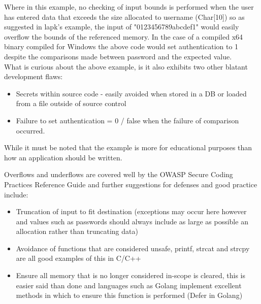 \documentclass{IEEEtran}
\begin{document}
                Where in this example, no checking of input bounds is performed when the user has 
                entered data that exceeds the size allocated to username (Char[10]) so as suggested 
                in lapk's\cite{lapk} example, the input of "0123456789abcdef1" would easily overflow
                the bounds of the referenced memory. In the case of a compiled x64 binary compiled for 
                Windows the above code would set authentication to 1 despite the comparisons made between password and the expected value.
                \\
                What is curious about the above example, is it also exhibits two other blatant 
                development flaws\cite{OWASP-SCP-Quick-Reference-Guide-v2}: 
                \begin{itemize}
                    \item Secrets within source code - easily avoided when stored in a DB or loaded
                    from a file outside of source control
                    \item Failure to set authentication = 0 / false when the failure of comparison 
                    occurred.
                \end{itemize}
                While it must be noted that the example is more for educational purposes than how an 
                application should be written.

                Overflows and underflows are covered well by the OWASP Secure Coding Practices
                Reference Guide\cite{OWASP-SCP-Quick-Reference-Guide-v2} and further suggestions 
                for defenses and good practice include: 
                \begin{itemize}
                    \item Truncation of input to fit destination (exceptions may occur here however and values such as passwords should always include as large as possible an allocation rather than truncating data)
                    \item Avoidance of functions that are considered unsafe, printf, strcat and 
                    strcpy are all good examples of this in C/C++
                    \item Ensure all memory that is no longer considered in-scope is cleared, this 
                    is easier said than done and languages such as Golang\cite{Golang} implement 
                    excellent methods in which to ensure this function is performed (Defer in Golang)\cite{Golang-Defer}
                \end{itemize}
\end{document}
